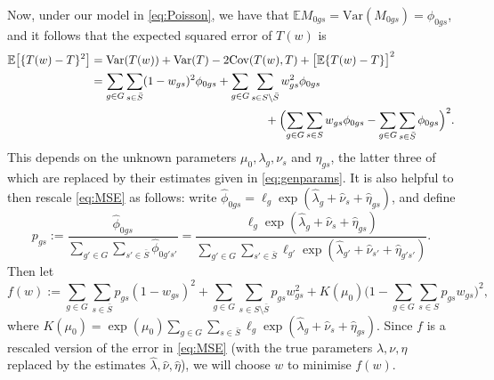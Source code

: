 \documentclass[12pt]{article}
\newcommand{\var}{\mathrm{Var}}
\begin{document}
Now, under our model in \eqref{eq:Poisson}, we have that $\mathbb{E}M_{0gs} = \var(M_{0gs}) = \phi_{0gs}$, and it follows that the expected squared error of $T(w)$ is
\begin{align}
\label{eq:MSE}
\mathbb{E}\bigl[\{T(w) - T\}^2\bigr] & = \mathrm{Var}(T(w)) + \mathrm{Var}(T) - 2\mathrm{Cov}(T(w), T) + \bigl[\mathbb{E}\{T(w) - T\}\bigr]^2  \nonumber \\
& = \sum_{g \in G} \sum_{s \in \bar{S}}(1- w_{gs})^2\phi_{0gs} + \sum_{g \in G} \sum_{s \in S \setminus \bar{S}}w_{gs}^2\phi_{0gs}  \nonumber \\ & \hspace{150pt} + \Bigl(\sum_{g \in G}\sum_{s \in S}w_{gs}\phi_{0gs}
- \sum_{g \in G} \sum_{s \in \bar{S}}\phi_{0gs} \Bigr)^2.
\end{align} 
This depends on the unknown parameters $\mu_0, \lambda_g, \nu_s$ and $\eta_{gs}$, the latter three of which are replaced by their estimates given in \eqref{eq:genparams}.  It is also helpful to then rescale  \eqref{eq:MSE} as follows: write $\hat{\phi}_{0gs} = \ell_g\exp(\hat{\lambda}_g + \hat{\nu}_s + \hat{\eta}_{gs})$, and define
\[
p_{gs}  := \frac{\hat{\phi}_{0gs}}{\sum_{g' \in G} \sum_{s' \in \bar{S}} \hat{\phi}_{0g's'}} = \frac{\ell_g \exp(\hat{\lambda}_g + \hat{\nu}_s + \hat{\eta}_{gs})}{\sum_{g'\in G} \sum_{s'\in \bar{S}} \ell_{g'} \exp(\hat{\lambda}_{g'} + \hat{\nu}_{s'} + \hat{\eta}_{g's'})}.
\]
Then let
\[
f(w) := \sum_{g \in G}\sum_{s \in \bar{S}} p_{gs}(1-w_{gs})^2  + \sum_{g \in G}\sum_{ s\in S \setminus \bar{S}}p_{gs} w_{gs}^2 + K(\mu_0)\big( 1 - \sum_{g \in G}\sum_{s \in S}  p_{gs}w_{gs} \big)^2,
\]
where $K(\mu_0) = \exp(\mu_0)\sum_{g \in G}\sum_{s \in \bar{S}} \ell_{g}\exp(\hat{\lambda}_g + \hat{\nu}_s + \hat{\eta}_{gs})$. Since $f$ is a rescaled version of the error in \eqref{eq:MSE} (with the true parameters $\lambda, \nu, \eta$ replaced by the estimates $\hat{\lambda}, \hat{\nu}, \hat{\eta}$), we will choose $w$ to minimise $f(w)$.  
\end{document}
